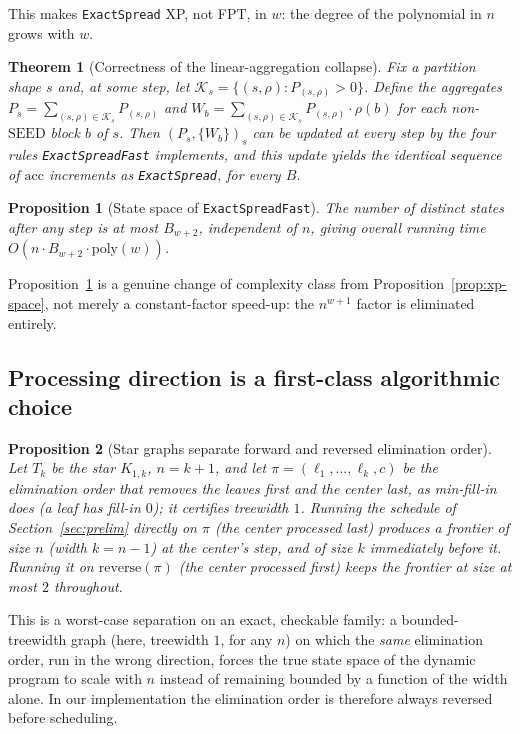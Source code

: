\documentclass[preprint,11pt]{elsarticle}
\newtheorem{theorem}{Theorem}
\newtheorem{proposition}{Proposition}
\theoremstyle{definition}
\theoremstyle{remark}
\begin{document}
This makes \texttt{ExactSpread} XP, not FPT, in $w$: the degree of the
polynomial in $n$ grows with $w$.

\begin{theorem}[Correctness of the linear-aggregation collapse]\label{thm:twig-collapse}
Fix a partition shape $s$ and, at some step, let
$\mathcal K_s=\{(s,\rho):P_{(s,\rho)}>0\}$. Define the aggregates
$P_s=\sum_{(s,\rho)\in\mathcal K_s}P_{(s,\rho)}$ and
$W_b=\sum_{(s,\rho)\in\mathcal K_s}P_{(s,\rho)}\cdot\rho(b)$ for each
non-$\mathrm{SEED}$ block $b$ of $s$. Then $(P_s,\{W_b\})_s$ can be updated
at every step by the four rules \texttt{ExactSpreadFast} implements, and
this update yields the identical sequence of $\mathrm{acc}$ increments as
\texttt{ExactSpread}, for every $B$.
\end{theorem}

\begin{proposition}[State space of \texttt{ExactSpreadFast}]\label{prop:fpt-space}
The number of distinct states after any step is at most $B_{w+2}$, independent
of $n$, giving overall running time $O(n\cdot B_{w+2}\cdot\mathrm{poly}(w))$.
\end{proposition}

Proposition~\ref{prop:fpt-space} is a genuine change of complexity class
from Proposition~\ref{prop:xp-space}, not merely a constant-factor speed-up:
the $n^{w+1}$ factor is eliminated entirely.

\subsection{Processing direction is a first-class algorithmic choice}\label{sec:twig-direction}

\begin{proposition}[Star graphs separate forward and reversed elimination order]\label{prop:direction}
Let $T_k$ be the star $K_{1,k}$, $n=k+1$, and let
$\pi=(\ell_1,\dots,\ell_k,c)$ be the elimination order that removes the
leaves first and the center last, as min-fill-in does (a leaf has fill-in $0$); it certifies
treewidth $1$. Running the schedule of Section~\ref{sec:prelim} directly on
$\pi$ (the center processed last) produces a frontier of size $n$ (width $k=n-1$) at the center's step,
and of size $k$ immediately before it. Running it on $\mathrm{reverse}(\pi)$
(the center processed first) keeps the frontier at size at most $2$
throughout.
\end{proposition}

This is a worst-case separation on an exact, checkable family: a
bounded-treewidth graph (here, treewidth $1$, for any $n$) on which the
\emph{same} elimination order, run in the wrong direction, forces the true
state space of the dynamic program to scale with $n$ instead of remaining
bounded by a function of the width alone. In our implementation the
elimination order is therefore always reversed before scheduling.
\end{document}
